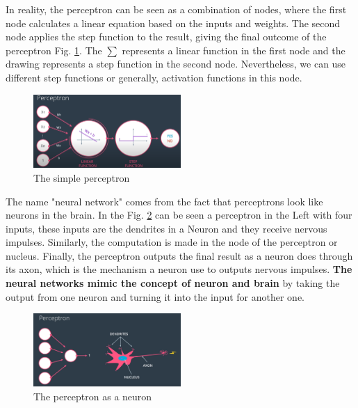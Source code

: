 \documentclass{article}
\begin{document}
In reality, the perceptron can be seen as a combination of nodes, where the first node calculates a linear equation based on the inputs and weights. The second node applies the step function to the result, giving the final outcome of the perceptron Fig. \ref{fig:f10}. The \(\sum\) represents a linear function in the first node and the drawing represents a step function in the second node. Nevertheless, we can use different step functions or generally, activation functions in this node.

\begin{figure}[ht]
    \centering
    \includegraphics[width=0.5\textwidth,height=0.5\textheight,keepaspectratio]{images/simple_perceptron.PNG}
    \captionsetup{justification=centering}
    \caption{The simple perceptron}
    \label{fig:f10}
\end{figure}

The name "neural network" comes from the fact that perceptrons look like neurons in the brain. In the Fig. \ref{fig:f11} can be seen a perceptron in the Left with four inputs, these inputs are the dendrites in a Neuron and they receive nervous impulses. Similarly, the computation is made in the node of the perceptron or nucleus. Finally, the perceptron outputs the final result as a neuron does through its axon, which is the mechanism a neuron use to outputs nervous impulses. \textbf{The neural networks mimic the concept of neuron and brain} by taking the output from one neuron and turning it into the input for another one.

\begin{figure}[ht]
    \centering
    \includegraphics[width=0.5\textwidth,height=0.5\textheight,keepaspectratio]{images/perceotron_neuron.png}
    \captionsetup{justification=centering}
    \caption{The perceptron as a neuron}
    \label{fig:f11}
\end{figure}
\end{document}
